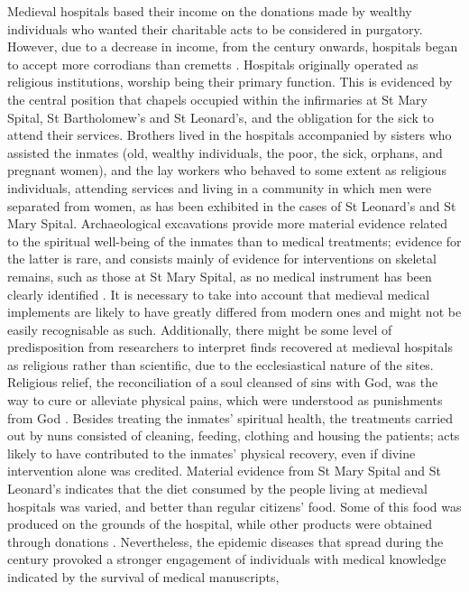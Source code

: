 \documentclass[%
	]{ijsra}
\renewcommand\AD{\xspace}
\begin{document}
Medieval hospitals based their income on the donations made by wealthy individuals who wanted their charitable acts to be considered in purgatory. However, due to a decrease in income, from the  century\AD onwards, hospitals began to accept more corrodians than cremetts \parencites[69]{Dean_2008}[207]{Malcom_2014}. 
Hospitals originally operated as religious institutions, worship being their primary function. This is evidenced by the central position that chapels occupied within the infirmaries at St Mary Spital, St Bartholomew’s and St Leonard’s, and the obligation for the sick to attend their services. Brothers lived in the hospitals accompanied by sisters who assisted the inmates (old, wealthy individuals, the poor, the sick, orphans, and pregnant women), and the lay workers who behaved to some extent as religious individuals, attending services and living in a community in which men were separated from women, as has been exhibited in the cases of St Leonard’s and St Mary Spital. 
Archaeological excavations provide more material evidence related to the spiritual well-being of the inmates than to medical treatments; evidence for the latter is rare, and consists mainly of evidence for interventions on skeletal remains, such as those at St Mary Spital, as no medical instrument has been clearly identified \parencite[65,76]{Bowers_2007}. 
It is necessary to take into account that medieval medical implements are likely to have greatly differed from modern ones and might not be easily recognisable as such. Additionally, there might be some level of predisposition from researchers to interpret finds recovered at medieval hospitals as religious rather than scientific, due to the ecclesiastical nature of the sites. 
Religious relief, the reconciliation of a soul cleansed of sins with God, was the way to cure or alleviate physical pains, which were understood as punishments from God \parencites[12-13,96]{Biller_2001}[42-43]{Rawcliffe_1995}. 
Besides treating the inmates’ spiritual health, the treatments carried out by nuns consisted of cleaning, feeding, clothing and housing the patients; acts likely to have contributed to the inmates’ physical recovery, even if divine intervention alone was credited. Material evidence from St Mary Spital and St Leonard’s indicates that the diet consumed by the people living at medieval hospitals was varied, and better than regular citizens’ food. Some of this food was produced on the grounds of the hospital, while other products were obtained through donations \parencites[76]{Egan_2007}[208]{Malcom_2014}.
Nevertheless, the epidemic diseases that spread during the  century\AD provoked a stronger engagement of individuals with medical knowledge indicated by the survival of medical manuscripts, 
\end{document}
